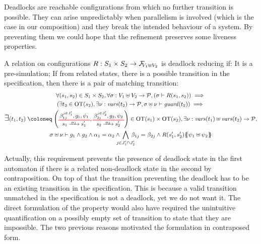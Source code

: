 \documentclass{article}
\begin{document}
Deadlocks are reachable configurations from which no further transition is possible.
They can arise unpredictably when parallelism is involved (which is the case in our composition) and they break the intended behaviour of a system.
By preventing them we could hope that the refinement preserves some liveness properties.
\begin{defi}
A relation on configurations \(R: S_1 \times S_2 \to \rformulas[V_1 \uplus V_2]\) is deadlock reducing if:
 It is a pre-simulation;
 If from related states, there is a possible transition in the specification, then there is a pair of matching transition:
\begin{multline*}
	\forall \mpar{s_1, s_2} \in S_1 \times S_2, \forall \sigma: V_1 \uplus V_2 \to \values, \mpar{\sigma \vdash R\mpar{s_1, s_2}} \implies \\
	\mpar{\exists t_2 \in \fOT{s_2}, \exists \nu: \fvars{t_2} \to \values, \sigma \uplus \nu \vdash \fguard{t_2}} \implies \\
	\bigsymb{\exists} \mpar{t_1, t_2} \defobject \mpar{\OTx{1}{}{1}{1}, \OTx{2}{}{2}{2}} \in \fOT{s_1} \times \fOT{s_2}, \exists \nu: \fvars{t_1} \uplus \fvars{t_2} \to \values, \\
	\sigma \uplus \nu \vdash g_1 \wedge g_2 \wedge \alpha_1 = \alpha_2 \wedge \bigwedge_\subbox{j \in J'_1 \cap J'_2} \beta_{1j} = \beta_{2j} \wedge R\mpar{s'_1, s'_2}\psubst{\psi_1 \uplus \psi_2}
\end{multline*}
\end{defi}
Actually, this requirement prevents the presence of deadlock state in the first automaton if there is a related non-deadlock state in the second by contraposition.
On top of that the transition preventing the deadlock has to be an existing transition in the specification.
This is because a valid transition unmatched in the specification is not a deadlock, yet we do not want it.
The direct formulation of the property would also have required the unintuitive quantification on a possibly empty set of transition to state that they are impossible.
The two previous reasons motivated the formulation in contraposed form.
\end{document}
